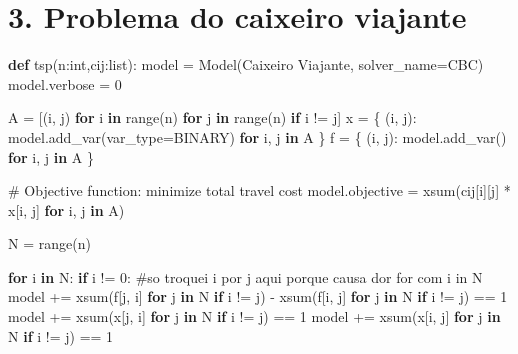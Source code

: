 \documentclass[
  letterpaper,
  DIV=11,
  numbers=noendperiod]{scrartcl}
\newenvironment{Shaded}{\begin{snugshade}}{\end{snugshade}}
\newcommand{\BuiltInTok}[1]{\textcolor[rgb]{0.00,0.23,0.31}{#1}}
\newcommand{\CommentTok}[1]{\textcolor[rgb]{0.37,0.37,0.37}{#1}}
\newcommand{\ControlFlowTok}[1]{\textcolor[rgb]{0.00,0.23,0.31}{\textbf{#1}}}
\newcommand{\DecValTok}[1]{\textcolor[rgb]{0.68,0.00,0.00}{#1}}
\newcommand{\KeywordTok}[1]{\textcolor[rgb]{0.00,0.23,0.31}{\textbf{#1}}}
\newcommand{\NormalTok}[1]{\textcolor[rgb]{0.00,0.23,0.31}{#1}}
\newcommand{\OperatorTok}[1]{\textcolor[rgb]{0.37,0.37,0.37}{#1}}
\newcommand{\StringTok}[1]{\textcolor[rgb]{0.13,0.47,0.30}{#1}}
\begin{document}
\section{\texorpdfstring{3. Problema do caixeiro
viajante\n}{3. Problema do caixeiro viajante}}\label{problema-do-caixeiro-viajante}

\begin{Shaded}
\begin{Highlighting}[]
\KeywordTok{def}\NormalTok{ tsp(n:}\BuiltInTok{int}\NormalTok{,cij:}\BuiltInTok{list}\NormalTok{):}
\NormalTok{    model }\OperatorTok{=}\NormalTok{ Model(}\StringTok{\textquotesingle{}Caixeiro Viajante\textquotesingle{}}\NormalTok{, solver\_name}\OperatorTok{=}\NormalTok{CBC)}
\NormalTok{    model.verbose }\OperatorTok{=} \DecValTok{0}

\NormalTok{    A }\OperatorTok{=}\NormalTok{ [(i, j) }\ControlFlowTok{for}\NormalTok{ i }\KeywordTok{in} \BuiltInTok{range}\NormalTok{(n) }\ControlFlowTok{for}\NormalTok{ j }\KeywordTok{in} \BuiltInTok{range}\NormalTok{(n) }\ControlFlowTok{if}\NormalTok{ i }\OperatorTok{!=}\NormalTok{ j]}
\NormalTok{    x }\OperatorTok{=}\NormalTok{ \{ (i, j): model.add\_var(var\_type}\OperatorTok{=}\NormalTok{BINARY) }\ControlFlowTok{for}\NormalTok{ i, j }\KeywordTok{in}\NormalTok{ A \}}
\NormalTok{    f }\OperatorTok{=}\NormalTok{ \{ (i, j): model.add\_var() }\ControlFlowTok{for}\NormalTok{ i, j }\KeywordTok{in}\NormalTok{ A \}}

    \CommentTok{\# Objective function: minimize total travel cost}
\NormalTok{    model.objective }\OperatorTok{=}\NormalTok{ xsum(cij[i][j] }\OperatorTok{*}\NormalTok{ x[i, j] }\ControlFlowTok{for}\NormalTok{ i, j }\KeywordTok{in}\NormalTok{ A)}

\NormalTok{    N }\OperatorTok{=} \BuiltInTok{range}\NormalTok{(n)  }

    \ControlFlowTok{for}\NormalTok{ i }\KeywordTok{in}\NormalTok{ N:}
        \ControlFlowTok{if}\NormalTok{ i }\OperatorTok{!=} \DecValTok{0}\NormalTok{:}
            \CommentTok{\#so troquei i por j aqui porque causa dor for com i in N}
\NormalTok{            model }\OperatorTok{+=}\NormalTok{ xsum(f[j, i] }\ControlFlowTok{for}\NormalTok{ j }\KeywordTok{in}\NormalTok{ N }\ControlFlowTok{if}\NormalTok{ i }\OperatorTok{!=}\NormalTok{ j) }\OperatorTok{{-}}\NormalTok{ xsum(f[i, j] }\ControlFlowTok{for}\NormalTok{ j }\KeywordTok{in}\NormalTok{ N }\ControlFlowTok{if}\NormalTok{ i }\OperatorTok{!=}\NormalTok{ j) }\OperatorTok{==} \DecValTok{1}
\NormalTok{            model }\OperatorTok{+=}\NormalTok{ xsum(x[j, i] }\ControlFlowTok{for}\NormalTok{ j }\KeywordTok{in}\NormalTok{ N }\ControlFlowTok{if}\NormalTok{ i }\OperatorTok{!=}\NormalTok{ j) }\OperatorTok{==} \DecValTok{1}
\NormalTok{            model }\OperatorTok{+=}\NormalTok{ xsum(x[i, j] }\ControlFlowTok{for}\NormalTok{ j }\KeywordTok{in}\NormalTok{ N }\ControlFlowTok{if}\NormalTok{ i }\OperatorTok{!=}\NormalTok{ j) }\OperatorTok{==} \DecValTok{1}


\end{Highlighting}
\end{Shaded}
\end{document}
